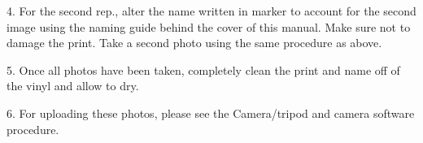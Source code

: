 \newpage

4. For the second rep., alter the name written in marker to account for the second image using the naming guide behind the cover of this manual. Make sure not to damage the print. Take a second photo using the same procedure as above. 

5. Once all photos have been taken, completely clean the print and name off of the vinyl and allow to dry. 


6. For uploading these photos, please see the Camera/tripod and camera software procedure. 





